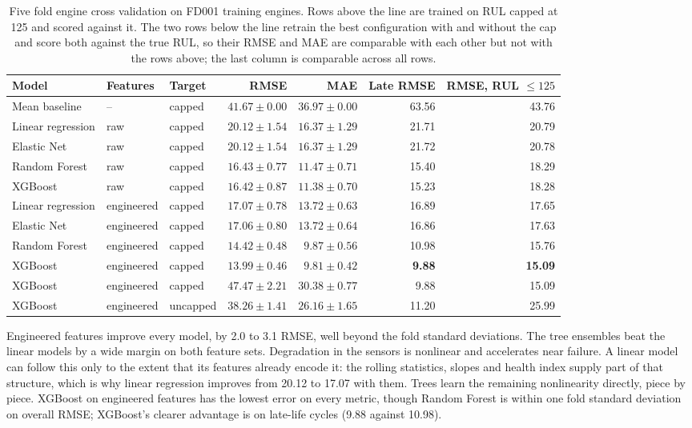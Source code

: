 \begin{table}[t]
\centering
\caption{Five fold engine cross validation on FD001 training engines. Rows
above the line are trained on RUL capped at 125 and scored against it. The
two rows below the line retrain the best configuration with and without the
cap and score both against the true RUL, so their RMSE and MAE are
comparable with each other but not with the rows above; the last column is
comparable across all rows.}
\label{tab:cv-results}
\small
\begin{tabular}{lllrrrr}
\hline
Model & Features & Target & RMSE & MAE & Late RMSE & RMSE, RUL $\le 125$ \\
\hline
Mean baseline     & --         & capped   & $41.67 \pm 0.00$ & $36.97 \pm 0.00$ & 63.56 & 43.76 \\
Linear regression & raw        & capped   & $20.12 \pm 1.54$ & $16.37 \pm 1.29$ & 21.71 & 20.79 \\
Elastic Net       & raw        & capped   & $20.12 \pm 1.54$ & $16.37 \pm 1.29$ & 21.72 & 20.78 \\
Random Forest     & raw        & capped   & $16.43 \pm 0.77$ & $11.47 \pm 0.71$ & 15.40 & 18.29 \\
XGBoost           & raw        & capped   & $16.42 \pm 0.87$ & $11.38 \pm 0.70$ & 15.23 & 18.28 \\
Linear regression & engineered & capped   & $17.07 \pm 0.78$ & $13.72 \pm 0.63$ & 16.89 & 17.65 \\
Elastic Net       & engineered & capped   & $17.06 \pm 0.80$ & $13.72 \pm 0.64$ & 16.86 & 17.63 \\
Random Forest     & engineered & capped   & $14.42 \pm 0.48$ & $9.87 \pm 0.56$  & 10.98 & 15.76 \\
XGBoost           & engineered & capped   & $\mathbf{13.99} \pm 0.46$ & $\mathbf{9.81} \pm 0.42$ & \textbf{9.88} & \textbf{15.09} \\
\hline
XGBoost           & engineered & capped   & $47.47 \pm 2.21$ & $30.38 \pm 0.77$ & 9.88  & 15.09 \\
XGBoost           & engineered & uncapped & $38.26 \pm 1.41$ & $26.16 \pm 1.65$ & 11.20 & 25.99 \\
\hline
\end{tabular}
\end{table}

Engineered features improve every model, by 2.0 to 3.1 RMSE, well beyond
the fold standard deviations. The tree ensembles beat the linear models by
a wide margin on both feature sets. Degradation in the sensors is
nonlinear and accelerates near failure. A linear model can follow this only
to the extent that its features already encode it: the rolling statistics,
slopes and health index supply part of that structure, which is why linear
regression improves from 20.12 to 17.07 with them. Trees learn the
remaining nonlinearity directly, piece by piece. XGBoost on
engineered features has the lowest error on every metric, though Random
Forest is within one fold standard deviation on overall RMSE; XGBoost's
clearer advantage is on late-life cycles (9.88 against 10.98).

